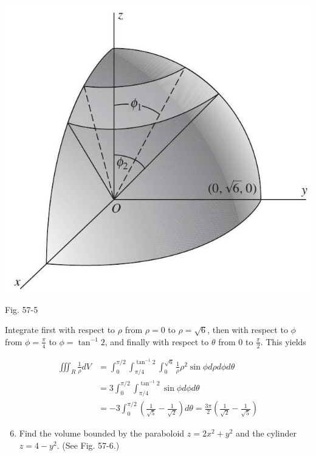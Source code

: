 \documentclass[10pt]{article}
\begin{document}
\begin{center}
\includegraphics[max width=\textwidth]{2024_04_20_fe2e8e718cc0fcd63d1bg-04}
\end{center}

Fig. 57-5

Integrate first with respect to $\rho$ from $\rho=0$ to $\rho=\sqrt{6}$, then with respect to $\phi$ from $\phi=\frac{\pi}{4}$ to $\phi=\tan ^{-1} 2$, and finally with respect to $\theta$ from 0 to $\frac{\pi}{2}$. This yields

$$
\begin{aligned}
\iiint_{R} \frac{1}{\rho} d V & =\int_{0}^{\pi / 2} \int_{\pi / 4}^{\tan ^{-1} 2} \int_{0}^{\sqrt{6}} \frac{1}{\rho} \rho^{2} \sin \phi d \rho d \phi d \theta \\
& =3 \int_{0}^{\pi / 2} \int_{\pi / 4}^{\tan ^{-1} 2} \sin \phi d \phi d \theta \\
& =-3 \int_{0}^{\pi / 2}\left(\frac{1}{\sqrt{5}}-\frac{1}{\sqrt{2}}\right) d \theta=\frac{3 \pi}{2}\left(\frac{1}{\sqrt{2}}-\frac{1}{\sqrt{5}}\right)
\end{aligned}
$$

\begin{enumerate}
  \setcounter{enumi}{5}
  \item Find the volume bounded by the paraboloid $z=2 x^{2}+y^{2}$ and the cylinder $z=4-y^{2}$. (See Fig. 57-6.)
\end{enumerate}
\end{document}
